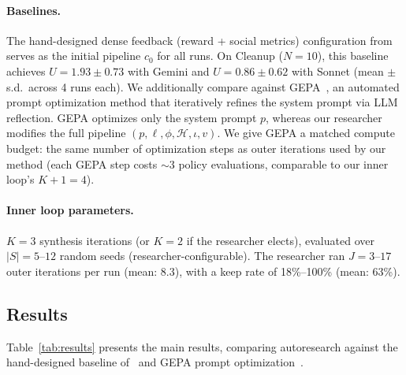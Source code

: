 \documentclass[10pt,twocolumn]{article}
\begin{document}
\paragraph{Baselines.}
The hand-designed dense feedback (reward + social metrics) configuration from~\cite{gallego2026} serves as the initial pipeline $c_0$ for all runs. On Cleanup ($N{=}10$), this baseline achieves $U{=}1.93{\pm}0.73$ with Gemini and $U{=}0.86{\pm}0.62$ with Sonnet (mean $\pm$ s.d.\ across 4 runs each). We additionally compare against GEPA~\cite{agrawal2026}, an automated prompt optimization method that iteratively refines the system prompt via LLM reflection. GEPA optimizes only the system prompt $p$, whereas our researcher modifies the full pipeline $(p, \ell, \phi, \mathcal{H}, \iota, v)$. We give GEPA a matched compute budget: the same number of optimization steps as outer iterations used by our method (each GEPA step costs ${\sim}3$ policy evaluations, comparable to our inner loop's $K{+}1{=}4$).

\paragraph{Inner loop parameters.}
$K{=}3$ synthesis iterations (or $K{=}2$ if the researcher elects), evaluated over $|S|{=}5$--$12$ random seeds (researcher-configurable). The researcher ran $J{=}3$--$17$ outer iterations per run (mean: 8.3), with a keep rate of 18\%--100\% (mean: 63\%).

\subsection{Results}

Table~\ref{tab:results} presents the main results, comparing autoresearch against the hand-designed baseline of~\cite{gallego2026} and GEPA prompt optimization~\cite{agrawal2026}.
\end{document}
